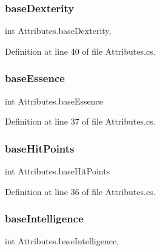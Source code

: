 \subsubsection{\texorpdfstring{baseDexterity}{baseDexterity}}
{\footnotesize\ttfamily int Attributes.\+base\+Dexterity\hspace{0.3cm}{\ttfamily [get]}, {\ttfamily [set]}}



Definition at line 40 of file Attributes.\+cs.

\mbox{\label{class_attributes_abe33f04d6f3a65b13a0d8f32965ea97b}} 
\subsubsection{\texorpdfstring{baseEssence}{baseEssence}}
{\footnotesize\ttfamily int Attributes.\+base\+Essence\hspace{0.3cm}{\ttfamily [get]}}



Definition at line 37 of file Attributes.\+cs.

\mbox{\label{class_attributes_ad0b60e0bc5aaad0933915672550423da}} 
\subsubsection{\texorpdfstring{baseHitPoints}{baseHitPoints}}
{\footnotesize\ttfamily int Attributes.\+base\+Hit\+Points\hspace{0.3cm}{\ttfamily [get]}}



Definition at line 36 of file Attributes.\+cs.

\mbox{\label{class_attributes_a729bcb2fcc52ce38fcd8c0a70d7f88f9}} 
\subsubsection{\texorpdfstring{baseIntelligence}{baseIntelligence}}
{\footnotesize\ttfamily int Attributes.\+base\+Intelligence\hspace{0.3cm}{\ttfamily [get]}, {\ttfamily [set]}}



